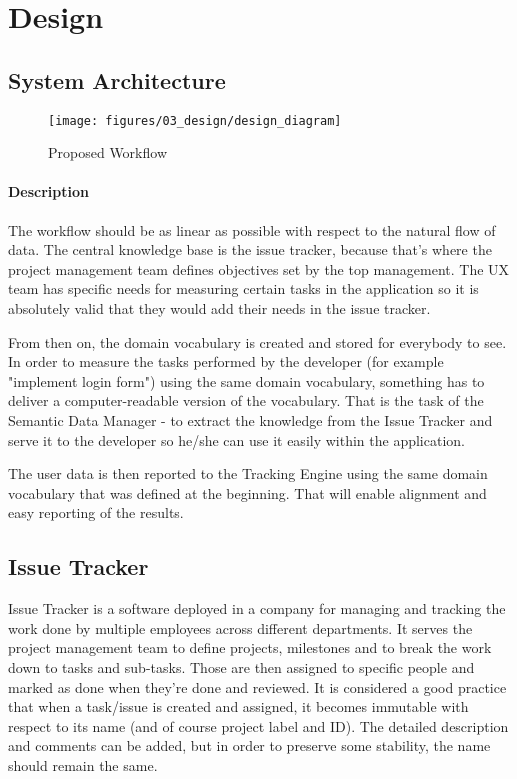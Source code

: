 \chapter{Design}

\section{System Architecture}

\begin{figure}[!ht]
	\centering
	\texttt{[image: figures/03\_design/design\_diagram]}
    \caption{Proposed Workflow}
\end{figure}

\subsubsection*{Description}

The workflow should be as linear as possible with respect to the natural flow of data. The central knowledge base is the issue tracker, because that's where the project management team defines objectives set by the top management. The UX team has specific needs for measuring certain tasks in the application so it is absolutely valid that they would add their needs in the issue tracker.

From then on, the domain vocabulary is created and stored for everybody to see. In order to measure the tasks performed by the developer (for example "implement login form") using the same domain vocabulary, something has to deliver a computer-readable version of the vocabulary. That is the task of the Semantic Data Manager - to extract the knowledge from the Issue Tracker and serve it to the developer so he/she can use it easily within the application.

The user data is then reported to the Tracking Engine using the same domain vocabulary that was defined at the beginning. That will enable alignment and easy reporting of the results.

\section{Issue Tracker}

Issue Tracker is a software deployed in a company for managing and tracking the work done by multiple employees across different departments. It serves the project management team to define projects, milestones and to break the work down to tasks and sub-tasks. Those are then assigned to specific people and marked as done when they're done and reviewed. It is considered a good practice that when a task/issue is created and assigned, it becomes immutable with respect to its name (and of course project label and ID). The detailed description and comments can be added, but in order to preserve some stability, the name should remain the same.

